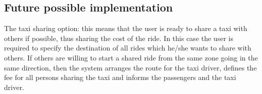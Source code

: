 \documentclass{article}
\begin{document}
	\subsection{Future possible implementation}
		The taxi sharing option: this means that the user is ready to 
		share a taxi with others if possible, thus sharing the cost of the ride. In this case 
		the user is required to specify the destination of all rides which he/she wants to 
		share with others. If others are willing to start a shared ride from the same zone 
		going in the same direction, then the system arranges the route for the taxi 
		driver, defines the fee for all persons sharing the taxi and informs the passengers 
		and the taxi driver.
\end{document}
